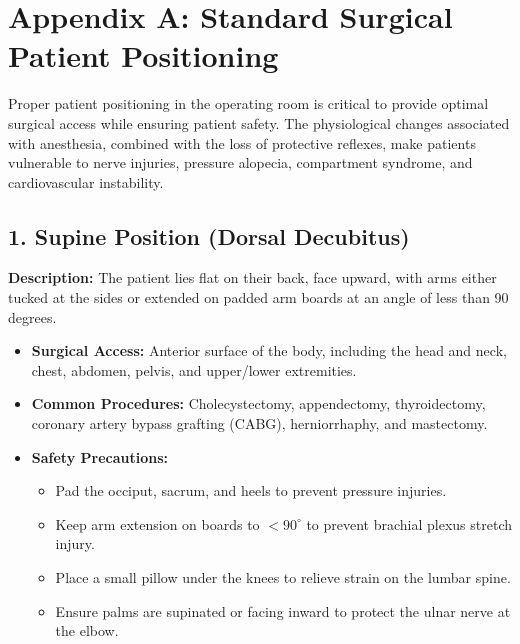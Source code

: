\chapter*{Appendix A: Standard Surgical Patient Positioning}

Proper patient positioning in the operating room is critical to provide optimal surgical access while ensuring patient safety. The physiological changes associated with anesthesia, combined with the loss of protective reflexes, make patients vulnerable to nerve injuries, pressure alopecia, compartment syndrome, and cardiovascular instability. 

\section*{1. Supine Position (Dorsal Decubitus)}
\textbf{Description:} The patient lies flat on their back, face upward, with arms either tucked at the sides or extended on padded arm boards at an angle of less than 90 degrees.
\begin{itemize}
  \item \textbf{Surgical Access:} Anterior surface of the body, including the head and neck, chest, abdomen, pelvis, and upper/lower extremities.
  \item \textbf{Common Procedures:} Cholecystectomy, appendectomy, thyroidectomy, coronary artery bypass grafting (CABG), herniorrhaphy, and mastectomy.
  \item \textbf{Safety Precautions:}
  \begin{itemize}
    \item Pad the occiput, sacrum, and heels to prevent pressure injuries.
    \item Keep arm extension on boards to $<90^{\circ}$ to prevent brachial plexus stretch injury.
    \item Place a small pillow under the knees to relieve strain on the lumbar spine.
    \item Ensure palms are supinated or facing inward to protect the ulnar nerve at the elbow.
  \end{itemize}
\end{itemize}


